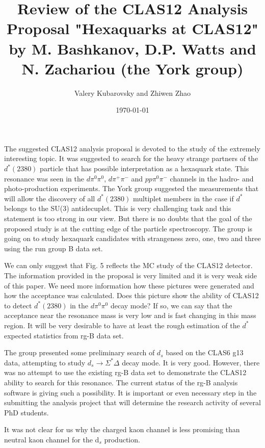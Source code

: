 \documentclass[prc,floatfix,superscriptaddress,letter]{revtex4}
\begin{document}
\title{Review of the CLAS12 Analysis Proposal "Hexaquarks at CLAS12"  \\
by M. Bashkanov, D.P. Watts and  N. Zachariou (the York group)}
\author{Valery Kubarovsky and Zhiwen Zhao}
\date{\today}
\maketitle

The suggested CLAS12 analysis proposal is devoted to the study of the extremely interesting topic. It was suggested to search for the heavy strange partners of the $d^*(2380)$ particle that has possible interpretation as a hexaquark state. This resonance was seen in the $d\pi^0\pi^0$, $d\pi^+\pi^-$ and $pp\pi^0\pi^-$ channels in the hadro- and photo-production experiments. The York group suggested the measurements that will allow the discovery of all  $d^*(2380)$ multiplet members in the case if $d^*$ belongs to the SU(3) antidecuplet. This is very challenging task and this statement is too strong in our view. But there is no doubts that the goal of the proposed study is at the cutting edge of the particle spectroscopy. The group is going on to study hexaquark candidates with strangeness zero, one, two and three using the run group B data set.

We can only suggest that Fig. 5 reflects the MC study of the CLAS12 detector. The information provided in the proposal is very limited and it is very weak side of this paper.  We need more information how these pictures were generated and how the acceptance was calculated.
Does this picture show the ability of CLAS12 to detect $d^*(2380)$ in the $d\pi^0\pi^0$ decay mode?
If so, we can say that the acceptance near the resonance mass is very low and 
is fast changing in this mass region.
 It will be very desirable to have at least the rough estimation of the $d^*$ expected statistics from rg-B data set.


The group presented some preliminary search of $d_s$ based on the CLAS6 g13 data, attempting to study 
$d_s\to \Sigma^*\Delta$ decay mode. It is very good. However, there was no attempt to use the existing rg-B data set 
to demonstrate the CLAS12 ability to search for this resonance. The current status of the rg-B analysis software is giving such a possibility. It is important or even necessary step in the submitting the analysis project that will determine the 
 research activity of  several PhD students.

It was not clear for us   why the charged kaon channel 
is less promising than neutral kaon channel for the d$_s$ production.
\end{document}
